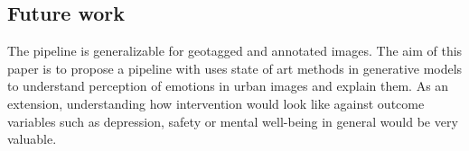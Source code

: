 \subsection{Future work}
The pipeline is generalizable for geotagged and annotated images. The aim of this paper is to propose a pipeline with uses state of art methods in generative models to understand perception of emotions in urban images and explain them. As an extension, understanding how intervention would look like against outcome variables such as depression, safety or mental well-being in general would be very valuable.